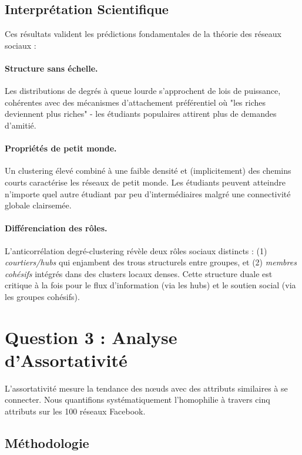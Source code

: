 \documentclass[12pt,a4paper]{article}
\begin{document}
\subsection{Interprétation Scientifique}

Ces résultats valident les prédictions fondamentales de la théorie des réseaux sociaux :

\paragraph{Structure sans échelle.} Les distributions de degrés à queue lourde s'approchent de lois de puissance, cohérentes avec des mécanismes d'attachement préférentiel où "les riches deviennent plus riches" - les étudiants populaires attirent plus de demandes d'amitié.

\paragraph{Propriétés de petit monde.} Un clustering élevé combiné à une faible densité et (implicitement) des chemins courts caractérise les réseaux de petit monde. Les étudiants peuvent atteindre n'importe quel autre étudiant par peu d'intermédiaires malgré une connectivité globale clairsemée.

\paragraph{Différenciation des rôles.} L'anticorrélation degré-clustering révèle deux rôles sociaux distincts : (1) \textit{courtiers/hubs} qui enjambent des trous structurels entre groupes, et (2) \textit{membres cohésifs} intégrés dans des clusters locaux denses. Cette structure duale est critique à la fois pour le flux d'information (via les hubs) et le soutien social (via les groupes cohésifs).

\section{Question 3 : Analyse d'Assortativité}

L'assortativité mesure la tendance des nœuds avec des attributs similaires à se connecter. Nous quantifions systématiquement l'homophilie à travers cinq attributs sur les 100 réseaux Facebook.

\subsection{Méthodologie}
\end{document}
